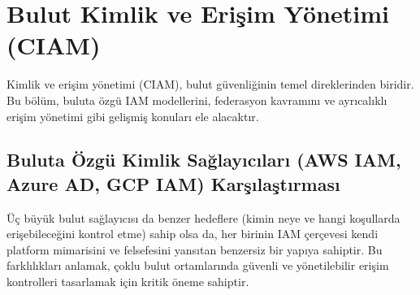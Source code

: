 \section{Bulut Kimlik ve Erişim Yönetimi (CIAM)}
Kimlik ve erişim yönetimi (CIAM), bulut güvenliğinin temel direklerinden biridir. Bu bölüm, buluta özgü IAM modellerini, federasyon kavramını ve ayrıcalıklı erişim yönetimi gibi gelişmiş konuları ele alacaktır.

\subsection{Buluta Özgü Kimlik Sağlayıcıları (AWS IAM, Azure AD, GCP IAM) Karşılaştırması}
Üç büyük bulut sağlayıcısı da benzer hedeflere (kimin neye ve hangi koşullarda erişebileceğini kontrol etme) sahip olsa da, her birinin IAM çerçevesi kendi platform mimarisini ve felsefesini yansıtan benzersiz bir yapıya sahiptir. Bu farklılıkları anlamak, çoklu bulut ortamlarında güvenli ve yönetilebilir erişim kontrolleri tasarlamak için kritik öneme sahiptir.

